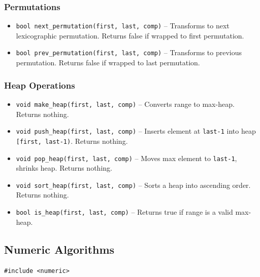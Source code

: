 \subsubsection{Permutations}
\begin{itemize}
\item \texttt{bool next\_permutation(first, last, comp)} -- Transforms to next lexicographic permutation. Returns false if wrapped to first permutation.
\item \texttt{bool prev\_permutation(first, last, comp)} -- Transforms to previous permutation. Returns false if wrapped to last permutation.
\end{itemize}

\subsubsection{Heap Operations}
\begin{itemize}
\item \texttt{void make\_heap(first, last, comp)} -- Converts range to max-heap. Returns nothing.
\item \texttt{void push\_heap(first, last, comp)} -- Inserts element at \texttt{last-1} into heap \texttt{[first, last-1)}. Returns nothing.
\item \texttt{void pop\_heap(first, last, comp)} -- Moves max element to \texttt{last-1}, shrinks heap. Returns nothing.
\item \texttt{void sort\_heap(first, last, comp)} -- Sorts a heap into ascending order. Returns nothing.
\item \texttt{bool is\_heap(first, last, comp)} -- Returns true if range is a valid max-heap.
\end{itemize}


\subsection{Numeric Algorithms}
\texttt{\#include <numeric>}

